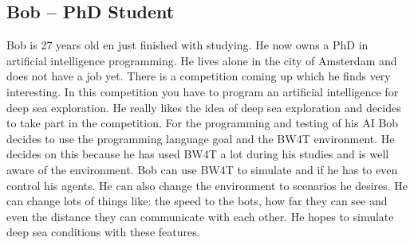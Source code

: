 \subsection{Bob – PhD Student}
Bob is 27 years old en just finished with studying. He now owns a PhD in artificial intelligence programming. He lives alone in the city of Amsterdam and does not have a job yet. There is a competition coming up which he finds very interesting. In this competition you have to program an artificial intelligence for deep sea exploration. He really likes the idea of deep sea exploration and decides to take part in the competition. 
For the programming and testing of his AI Bob decides to use the programming language goal and the BW4T environment. He decides on this because he has used BW4T a lot during his studies and is well aware of the environment. Bob can use BW4T to simulate and if he has to even control his agents. He can also change the environment to scenarios he desires. He can change lots of things like: the speed to the bots, how far they can see and even the distance they can communicate with each other. He hopes to simulate deep sea conditions with these features.

